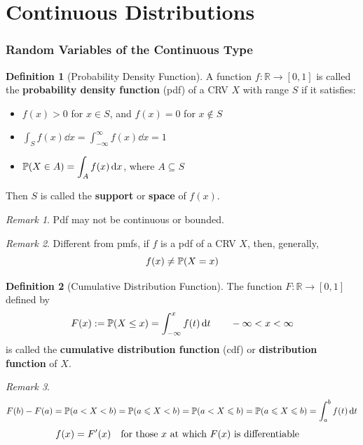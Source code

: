 \documentclass[10pt,UTF8]{article}
\newenvironment{definition box}
{\begin{tcolorbox}[colback=blue!5!white,colframe=blue!75!black,parbox=false,before upper=\par,before lower=\par]}
{\end{tcolorbox}}
\newenvironment{theorem box}
{\begin{tcolorbox}[colback=yellow!5!white,colframe=yellow!75!black,parbox=false,before upper=\par,before lower=\par]}
{\end{tcolorbox}}
\theoremstyle{definition}
\newtheorem{definition inner}{Definition}[section]
\newenvironment{definition}[1][]
{\begin{definition box}\begin{definition inner}[#1]\hfill\par}
{\end{definition inner}\end{definition box}}
\theoremstyle{plain}
\newtheorem{theorem inner}{Theorem}[section]
\theoremstyle{definition}
\newtheorem*{proof inner}{\textit{Proof}}
\theoremstyle{remark}
\newtheorem*{remark}{\textit{Remark}}
\newcommand{\Prob}{\mathbb{P}\qty}
\begin{document}
\part*{Continuous Distributions}

\section{Random Variables of the Continuous Type}

\begin{definition}[Probability Density Function]
    A function $f\colon\mathbb{R}\rightarrow[0,1]$
    is called the \textbf{probability density function} (pdf) of
    a CRV $X$ with range $S$ if it satisfies:
    \begin{itemize}
        \item $f(x)>0$ for $x\in S$, and $f(x)=0$ for $x\notin S$
        \item $\displaystyle\int_{S}f(x)\dd{x}=\int_{-\infty}^{\infty}f(x)\dd{x}=1$
        \item $\displaystyle \Prob(X\in A)=\int_{A}f(x)\dd{x}$, where $A\subseteq S$
    \end{itemize}
    Then $S$ is called the \textbf{support} or \textbf{space} of $f(x)$.
\end{definition}

\begin{remark}
    Pdf may not be continuous or bounded.
\end{remark}

\begin{remark}
    Different from pmfs, if $f$ is a pdf of a CRV $X$, then, generally,
    \begin{equation*}
        f(x) \neq \Prob(X=x)
    \end{equation*}
\end{remark}

\begin{definition}[Cumulative Distribution Function]
    The function $F\colon\mathbb{R}\rightarrow[0,1]$
    defined by
    \begin{equation*}
        F(x) := \Prob(X\leq x) = \int_{-\infty}^{x}f(t)\dd{t}
        \qquad -\infty<x<\infty
    \end{equation*}
    is called the \textbf{cumulative distribution function} (cdf)
    or \textbf{distribution function} of $X$.
\end{definition}
\begin{remark}
    \begin{equation*}
        F(b) - F(a) =
        \Prob(a<X< b) = \Prob(a\leqslant X< b) =
        \Prob(a<X\leqslant b) = \Prob(a\leqslant X\leqslant b)
        = \int_{a}^{b}f(t)\dd{t}
    \end{equation*}
    \begin{equation*}
        f(x) = F'(x)
        \qq{for those $x$ at which $F(x)$ is differentiable}
    \end{equation*}
\end{remark}
\end{document}
